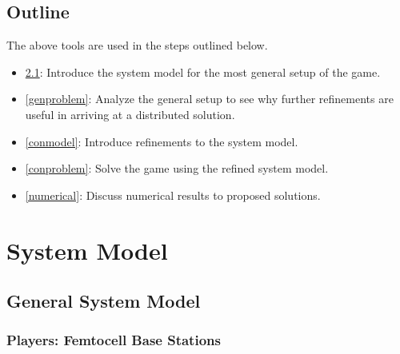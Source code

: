 \documentclass[12pt,a4paper]{report}
\begin{document}
\section{Outline}
The above tools are used in the steps outlined below. 
\begin{itemize}
\item 
\ref{genmodel}: Introduce the system model for the most general setup of the game.
\item 
\ref{genproblem}: Analyze the general setup to see why further refinements are useful in arriving at a distributed solution. 
\item
\ref{conmodel}: Introduce refinements to the system model.
\item 
\ref{conproblem}: Solve the game using the refined system model.
\item 
\ref{numerical}: Discuss numerical results to proposed solutions. 
\end{itemize}
\chapter{System Model}

\section{General System Model}\label{genmodel}

\subsection{Players: Femtocell Base Stations}
\end{document}
